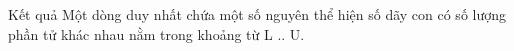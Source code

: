 Kết quả
Một dòng duy nhất chứa một số nguyên thể hiện số dãy con có số lượng phần tử khác nhau nằm trong khoảng từ L .. U.